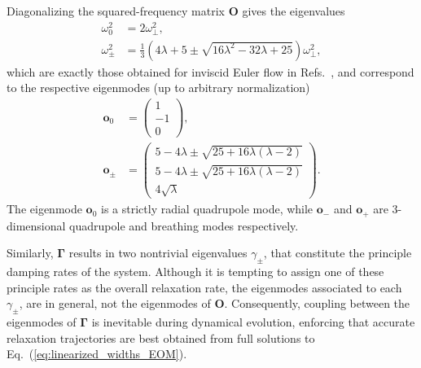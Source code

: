 \documentclass[reprint, amsmath, amssymb, aps, superscriptaddress]{revtex4-1}
\begin{document}
Diagonalizing the squared-frequency matrix $\boldsymbol{O}$ gives the eigenvalues
\begin{subequations} \label{eq:eigenfrequencies}
\begin{align} 
    \omega_0^2 
    &=
    2 \omega_{\perp}^2, \\
    \omega^2_{\pm} 
    &= 
    \frac{ 1 }{ 3 } 
    \left( 4 \lambda + 5 \pm \sqrt{16 \lambda^2 - 32 \lambda + 25} \right)
    \omega_{\perp}^2,
\end{align}
\end{subequations}
which are exactly those obtained for inviscid Euler flow in Refs.~\cite{Griffin97_PRL, Kavoulakis98_PRA}, and correspond to the respective eigenmodes (up to arbitrary normalization)
\begin{subequations} \label{eq:eigenmodes}
\begin{align}
    \boldsymbol{o}_0
    &=
    \begin{pmatrix}
        1 \\ -1 \\0
    \end{pmatrix}, \\
    \boldsymbol{o}_{\pm}
    &=
    \begin{pmatrix}
        5 - 4 \lambda \pm \sqrt{ 25 + 16 \lambda ( \lambda - 2 ) } \\ 
        5 - 4 \lambda \pm \sqrt{ 25 + 16 \lambda ( \lambda - 2 ) } \\ 
        4 \sqrt{\lambda }
    \end{pmatrix}.
\end{align}
\end{subequations}
The eigenmode $\boldsymbol{o}_0$ is a strictly radial quadrupole mode, while $\boldsymbol{o}_{-}$ and $\boldsymbol{o}_{+}$ are 3-dimensional quadrupole and breathing modes respectively. 


Similarly, $\boldsymbol{\Gamma}$ results in two nontrivial eigenvalues $\gamma_{\pm}$, that constitute the principle damping rates of the system. Although it is tempting to assign one of these principle rates as the overall relaxation rate, the eigenmodes associated to each $\gamma_{\pm}$, are in general, not the eigenmodes of $\boldsymbol{O}$. Consequently, coupling between the eigenmodes of $\boldsymbol{\Gamma}$ is inevitable during dynamical evolution, enforcing that accurate relaxation trajectories are best obtained from full solutions to Eq.~(\ref{eq:linearized_widths_EOM}). 
\end{document}
